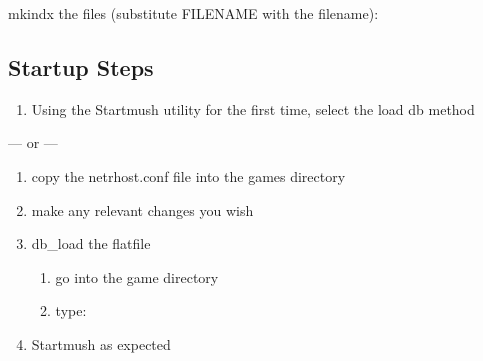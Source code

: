 \documentclass[letterpaper,10pt,english]{sphinxmanual}
\begin{document}
\sphinxAtStartPar
mkindx the files (substitute FILENAME with the filename):

\begin{sphinxVerbatim}[commandchars=\\\{\}]
 
  
\end{sphinxVerbatim}


\subsection{Startup Steps}
\label{\detokenize{gettingstarted:startup-steps}}\begin{enumerate}
%
\item {} 
\sphinxAtStartPar
Using the Startmush utility for the first time, select the load db method

\end{enumerate}

\sphinxAtStartPar
— or —
\begin{enumerate}
%
\item {} 
\sphinxAtStartPar
copy the netrhost.conf file into the games directory

\item {} 
\sphinxAtStartPar
make any relevant changes you wish

\item {} 
\sphinxAtStartPar
db\_load the flatfile
\begin{enumerate}
%
\item {} 
\sphinxAtStartPar
go into the game directory

\item {} 
\sphinxAtStartPar
type:

\begin{sphinxVerbatim}[commandchars=\\\{\}]
   
\end{sphinxVerbatim}

\end{enumerate}

\item {} 
\sphinxAtStartPar
Startmush as expected

\end{enumerate}
\end{document}
